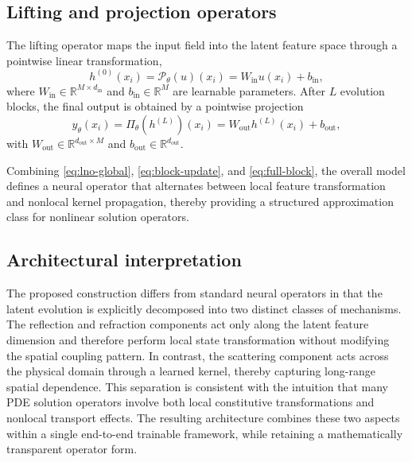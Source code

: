 \documentclass{article}
\begin{document}
\subsection{Lifting and projection operators}

The lifting operator maps the input field into the latent feature space through a pointwise linear transformation,
\begin{equation}
h^{(0)}(x_i) = \mathcal{P}_\theta(u)(x_i) = W_{\mathrm{in}} u(x_i) + b_{\mathrm{in}},
\label{eq:lifting}
\end{equation}
where $W_{\mathrm{in}} \in \mathbb{R}^{M \times d_{\mathrm{in}}}$ and $b_{\mathrm{in}} \in \mathbb{R}^M$ are learnable parameters. After $L$ evolution blocks, the final output is obtained by a pointwise projection
\begin{equation}
y_\theta(x_i)
=
\Pi_\theta(h^{(L)})(x_i)
=
W_{\mathrm{out}} h^{(L)}(x_i) + b_{\mathrm{out}},
\label{eq:projection}
\end{equation}
with $W_{\mathrm{out}} \in \mathbb{R}^{d_{\mathrm{out}} \times M}$ and $b_{\mathrm{out}} \in \mathbb{R}^{d_{\mathrm{out}}}$.

Combining \eqref{eq:lno-global}, \eqref{eq:block-update}, and \eqref{eq:full-block}, the overall model defines a neural operator that alternates between local feature transformation and nonlocal kernel propagation, thereby providing a structured approximation class for nonlinear solution operators.

\subsection{Architectural interpretation}

The proposed construction differs from standard neural operators in that the latent evolution is explicitly decomposed into two distinct classes of mechanisms. The reflection and refraction components act only along the latent feature dimension and therefore perform local state transformation without modifying the spatial coupling pattern. In contrast, the scattering component acts across the physical domain through a learned kernel, thereby capturing long-range spatial dependence. This separation is consistent with the intuition that many PDE solution operators involve both local constitutive transformations and nonlocal transport effects. The resulting architecture combines these two aspects within a single end-to-end trainable framework, while retaining a mathematically transparent operator form.



% 
% 
\end{document}
